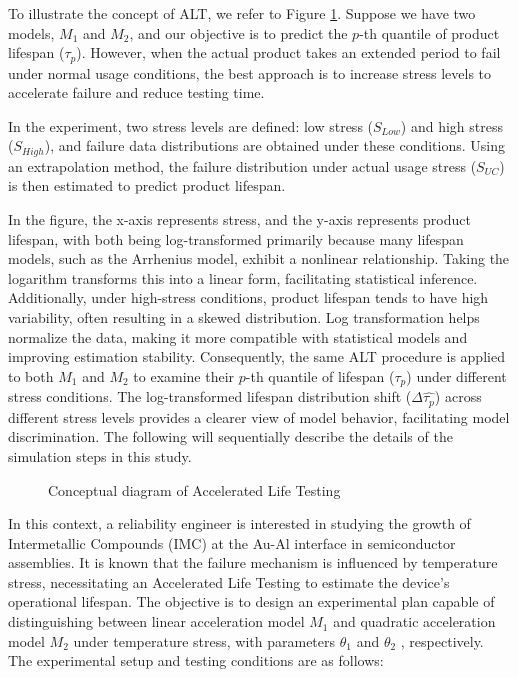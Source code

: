 \hspace*{8mm} To illustrate the concept of ALT, we refer to Figure \ref{fig:ALT concept}. Suppose we have two models, $M_1$ and $M_2$, and our objective is to predict the $p$-th quantile of product lifespan ($\tau_p$). However, when the actual product takes an extended period to fail under normal usage conditions, the best approach is to increase stress levels to accelerate failure and reduce testing time.   

\hspace*{8mm} In the experiment, two stress levels are defined: low stress ($S_{Low}$) and high stress ($S_{High}$), and failure data distributions are obtained under these conditions. Using an extrapolation method, the failure distribution under actual usage stress ($S_{UC}$) is then estimated to predict product lifespan.

\hspace*{8mm} In the figure, the x-axis represents stress, and the y-axis represents product lifespan, with both being log-transformed primarily because many lifespan models, such as the Arrhenius model, exhibit a nonlinear relationship. Taking the logarithm transforms this into a linear form, facilitating statistical inference. Additionally, under high-stress conditions, product lifespan tends to have high variability, often resulting in a skewed distribution. Log transformation helps normalize the data, making it more compatible with statistical models and improving estimation stability. Consequently, the same ALT procedure is applied to both $M_1$ and $M_2$ to examine their $p$-th quantile of lifespan ($\tau_p$) under different stress conditions. The log-transformed lifespan distribution shift ($\Delta\hat{\tau_p}$) across different stress levels provides a clearer view of model behavior, facilitating model discrimination. The following will sequentially describe the details of the simulation steps in this study.

\begin{figure}
    \caption{Conceptual diagram of Accelerated Life Testing \citep{nasir2015simulation}
}
\label{fig:ALT concept}
\end{figure}

\hspace*{8mm} In this context, a reliability engineer is interested in studying the growth of Intermetallic Compounds (IMC) at the Au-Al interface in semiconductor assemblies. It is known that the failure mechanism is influenced by temperature stress, necessitating an Accelerated Life Testing to estimate the device's operational lifespan. The objective is to design an experimental plan capable of distinguishing between linear acceleration model $M_1$ and quadratic acceleration model $M_2$ under temperature stress, with parameters $\theta_1$ and $\theta_2$ , respectively. The experimental setup and testing conditions are as follows:

